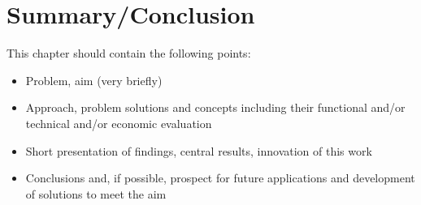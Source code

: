\chapter{Summary/Conclusion}
This chapter should contain the following points:
\begin{itemize}
	\item Problem, aim (very briefly)
	\item Approach, problem solutions and concepts including their functional and/or technical and/or economic evaluation
	\item Short presentation of findings, central results, innovation of this work
	\item Conclusions and, if possible, prospect for future applications and development of solutions to meet the aim
\end{itemize}